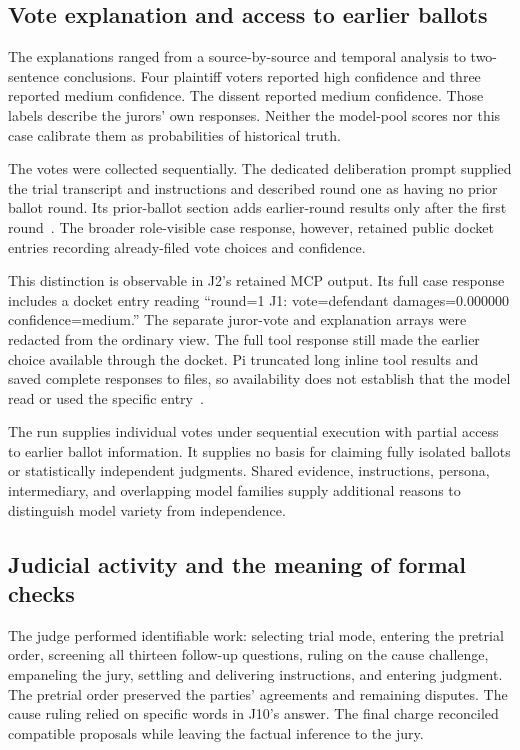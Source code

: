 \subsection{Vote explanation and access to earlier ballots}

The explanations ranged from a source-by-source and temporal analysis to two-sentence conclusions.  Four plaintiff voters reported high confidence and three reported medium confidence.  The dissent reported medium confidence.  Those labels describe the jurors' own responses.  Neither the model-pool scores nor this case calibrate them as probabilities of historical truth.

The votes were collected sequentially.  The dedicated deliberation prompt supplied the trial transcript and instructions and described round one as having no prior ballot round.  Its prior-ballot section adds earlier-round results only after the first round~\cite{jurorprompt}.  The broader role-visible case response, however, retained public docket entries recording already-filed vote choices and confidence.

This distinction is observable in J2's retained MCP output.  Its full case response includes a docket entry reading “round=1 J1: vote=defendant damages=0.000000 confidence=medium.”  The separate juror-vote and explanation arrays were redacted from the ordinary view.  The full tool response still made the earlier choice available through the docket.  Pi truncated long inline tool results and saved complete responses to files, so availability does not establish that the model read or used the specific entry~\cite[J2 deliberation output and role-visible state]{record}.

The run supplies individual votes under sequential execution with partial access to earlier ballot information.  It supplies no basis for claiming fully isolated ballots or statistically independent judgments.  Shared evidence, instructions, persona, intermediary, and overlapping model families supply additional reasons to distinguish model variety from independence.

\subsection{Judicial activity and the meaning of formal checks}

The judge performed identifiable work: selecting trial mode, entering the pretrial order, screening all thirteen follow-up questions, ruling on the cause challenge, empaneling the jury, settling and delivering instructions, and entering judgment.  The pretrial order preserved the parties' agreements and remaining disputes.  The cause ruling relied on specific words in J10's answer.  The final charge reconciled compatible proposals while leaving the factual inference to the jury.

